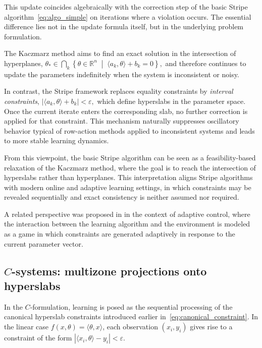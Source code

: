 \documentclass[a4paper,fleqn]{cas-sc}
\begin{document}
This update coincides algebraically with the correction step of the basic
Stripe algorithm~\eqref{eq:algo_simple} on iterations where a violation occurs.
The essential difference lies not in the update formula itself, but in the
underlying problem formulation.

The Kaczmarz method aims to find an exact solution in the intersection of
hyperplanes,
$
\theta_\ast \in \bigcap_k
\left\{
\theta \in \mathbb{R}^n
\;\middle|\;
\langle a_k, \theta \rangle + b_k = 0
\right\},
$
and therefore continues to update the parameters indefinitely when the system
is inconsistent or noisy.

In contrast, the Stripe framework replaces equality constraints by
\emph{interval constraints},
$
|\langle a_k, \theta \rangle + b_k| < \varepsilon,
$
which define hyperslabs in the parameter space.
Once the current iterate enters the corresponding slab, no further correction
is applied for that constraint.
This mechanism naturally suppresses oscillatory behavior typical of
row-action methods applied to inconsistent systems and leads to more stable
learning dynamics.

From this viewpoint, the basic Stripe algorithm can be seen as a feasibility-based
relaxation of the Kaczmarz method, where the goal is to reach the intersection
of hyperslabs rather than hyperplanes.
This interpretation aligns Stripe algorithms with modern online and adaptive
learning settings, in which constraints may be revealed sequentially and exact
consistency is neither assumed nor required.

A related perspective was proposed in \cite{Gusev2020} in the context of adaptive
control, where the interaction between the learning algorithm and the environment
is modeled as a game in which constraints are generated adaptively in response to
the current parameter vector.


\subsection{$C$-systems: multizone projections onto hyperslabs}
\label{subsec:C_systems}

In the $C$-formulation, learning is posed as the sequential processing
of the canonical hyperslab constraints
introduced earlier in~\eqref{eq:canonical_constraint}.
In the linear case $f(x,\theta)=\langle\theta,x\rangle$,
each observation $(x_i,y_i)$ gives rise to a constraint of the form
$
|\langle x_i,\theta\rangle - y_i| < \varepsilon .
$
\end{document}
